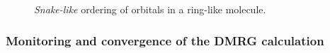\documentclass[letterpaper,12pt,aps, pra]{revtex4-1}
\begin{document}
\begin{figure} \begin{center}  \end{center} \caption{\emph{Snake-like} ordering of orbitals in a ring-like molecule.} \label{fig:order}
 \end{figure}

\subsubsection{Monitoring and convergence of the DMRG calculation}
\label{sec:dmrg_convergence}
\end{document}
